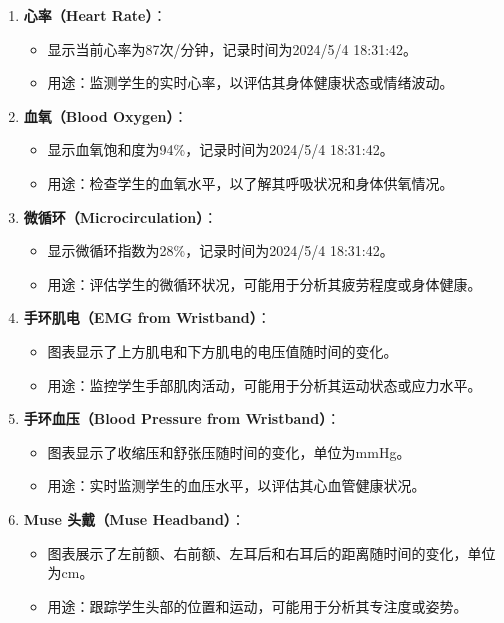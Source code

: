 \documentclass[oneside]{xduugthesis}
\begin{document}
\begin{enumerate}[nosep]
    \item \textbf{心率（Heart Rate）}：
    \begin{itemize}[nosep]
        \item 显示当前心率为87次/分钟，记录时间为2024/5/4 18:31:42。
        \item 用途：监测学生的实时心率，以评估其身体健康状态或情绪波动。
    \end{itemize}

    \item \textbf{血氧（Blood Oxygen）}：
    \begin{itemize}[nosep]
        \item 显示血氧饱和度为94\%，记录时间为2024/5/4 18:31:42。
        \item 用途：检查学生的血氧水平，以了解其呼吸状况和身体供氧情况。
    \end{itemize}

    \item \textbf{微循环（Microcirculation）}：
    \begin{itemize}[nosep]
        \item 显示微循环指数为28\%，记录时间为2024/5/4 18:31:42。
        \item 用途：评估学生的微循环状况，可能用于分析其疲劳程度或身体健康。
    \end{itemize}

    \item \textbf{手环肌电（EMG from Wristband）}：
    \begin{itemize}[nosep]
        \item 图表显示了上方肌电和下方肌电的电压值随时间的变化。
        \item 用途：监控学生手部肌肉活动，可能用于分析其运动状态或应力水平。
    \end{itemize}

    \item \textbf{手环血压（Blood Pressure from Wristband）}：
    \begin{itemize}[nosep]
        \item 图表显示了收缩压和舒张压随时间的变化，单位为mmHg。
        \item 用途：实时监测学生的血压水平，以评估其心血管健康状况。
    \end{itemize}

    \item \textbf{Muse 头戴（Muse Headband）}：
    \begin{itemize}[nosep]
        \item 图表展示了左前额、右前额、左耳后和右耳后的距离随时间的变化，单位为cm。
        \item 用途：跟踪学生头部的位置和运动，可能用于分析其专注度或姿势。
    \end{itemize}


\end{enumerate}
\end{document}
